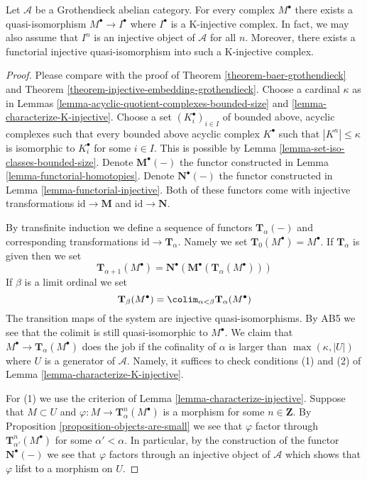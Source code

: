 \begin{theorem}
\label{theorem-K-injective-embedding-grothendieck}
Let $\mathcal{A}$ be a Grothendieck abelian category.
For every complex $M^\bullet$ there exists a quasi-isomorphism
$M^\bullet \to I^\bullet$ where $I^\bullet$ is a K-injective complex.
In fact, we may also assume that $I^n$ is an injective object of
$\mathcal{A}$ for all $n$. Moreover, there exists a functorial 
injective quasi-isomorphism into such a K-injective complex.
\end{theorem}

\begin{proof}
Please compare with the proof of
Theorem \ref{theorem-baer-grothendieck}
and
Theorem \ref{theorem-injective-embedding-grothendieck}.
Choose a cardinal $\kappa$ as in
Lemmas \ref{lemma-acyclic-quotient-complexes-bounded-size} and
\ref{lemma-characterize-K-injective}.
Choose a set $(K_i^\bullet)_{i \in I}$
of bounded above, acyclic complexes
such that every bounded above acyclic complex $K^\bullet$
such that $|K^n| \leq \kappa$ is isomorphic to $K_i^\bullet$ for some
$i \in I$. This is possible by
Lemma \ref{lemma-set-iso-classes-bounded-size}.
Denote $\mathbf{M}^\bullet(-)$ the functor constructed in
Lemma \ref{lemma-functorial-homotopies}.
Denote $\mathbf{N}^\bullet(-)$ the functor constructed in
Lemma \ref{lemma-functorial-injective}.
Both of these functors come with injective transformations
$\text{id} \to \mathbf{M}$ and $\text{id} \to \mathbf{N}$.

\medskip\noindent
By transfinite induction we define a sequence of functors
$\mathbf{T}_\alpha(-)$ and corresponding transformations
$\text{id} \to \mathbf{T}_\alpha$. Namely we set
$\mathbf{T}_0(M^\bullet) = M^\bullet$. If $\mathbf{T}_\alpha$ is
given then we set
$$
\mathbf{T}_{\alpha + 1}(M^\bullet) =
\mathbf{N}^\bullet(\mathbf{M}^\bullet(\mathbf{T}_\alpha(M^\bullet)))
$$
If $\beta$ is a limit ordinal we set
$$
\mathbf{T}_\beta(M^\bullet) =
\colim_{\alpha < \beta} \mathbf{T}_\alpha(M^\bullet)
$$
The transition maps of the system are injective quasi-isomorphisms.
By AB5 we see that the colimit is still quasi-isomorphic to $M^\bullet$.
We claim that $M^\bullet \to \mathbf{T}_\alpha(M^\bullet)$
does the job if the cofinality of $\alpha$ is larger than
$\max(\kappa, |U|)$ where $U$ is a generator of $\mathcal{A}$.
Namely, it suffices to check conditions (1) and (2) of
Lemma \ref{lemma-characterize-K-injective}.

\medskip\noindent
For (1) we use the criterion of
Lemma \ref{lemma-characterize-injective}.
Suppose that $M \subset U$ and $\varphi : M \to \mathbf{T}^n_\alpha(M^\bullet)$
is a morphism for some $n \in \mathbf{Z}$. By
Proposition \ref{proposition-objects-are-small}
we see that $\varphi$ factor through
$\mathbf{T}^n_{\alpha'}(M^\bullet)$ for some $\alpha' < \alpha$.
In particular, by the construction of the functor
$\mathbf{N}^\bullet(-)$ we see that $\varphi$ factors through
an injective object of $\mathcal{A}$ which shows that $\varphi$
lifst to a morphism on $U$.


\end{proof}
